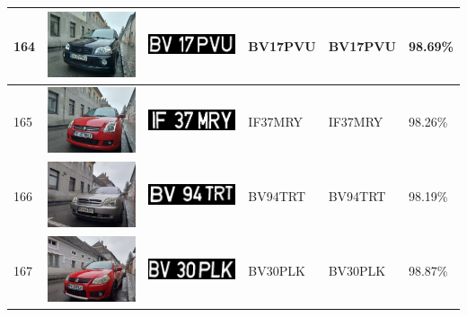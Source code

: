 \documentclass[a4paper,12pt]{report}
\begin{document}
\begin{longtable}{| m{0.6cm} | m{3cm} | m{3cm} | m{1.8cm} | m{1.8cm} | m{1.8cm} |}
    164 & \includegraphics[width=3cm,keepaspectratio]{dataset/101_d1.jpg} & \includegraphics[width=3cm,keepaspectratio]{segmentari/164.jpg} & BV17PVU             & BV17PVU              & 98.69\%    \\ \hline
    165 & \includegraphics[width=3cm,keepaspectratio]{dataset/102_d1.jpg} & \includegraphics[width=3cm,keepaspectratio]{segmentari/165.jpg} & IF37MRY             & IF37MRY              & 98.26\%    \\ \hline
    166 & \includegraphics[width=3cm,keepaspectratio]{dataset/103_d1.jpg} & \includegraphics[width=3cm,keepaspectratio]{segmentari/166.jpg} & BV94TRT             & BV94TRT              & 98.19\%    \\ \hline
    167 & \includegraphics[width=3cm,keepaspectratio]{dataset/104_d1.jpg} & \includegraphics[width=3cm,keepaspectratio]{segmentari/167.jpg} & BV30PLK             & BV30PLK              & 98.87\%    \\ \hline

\end{longtable}
\end{document}
